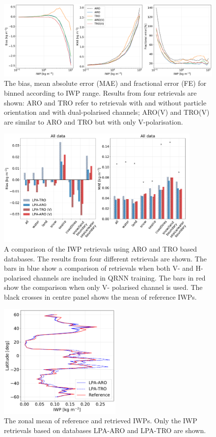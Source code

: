 \documentclass[amt, manuscript]{copernicus}
\begin{document}
\begin{figure}[t]
	\includegraphics[width=12cm]{Figures/IWP_statistics.pdf}
	\caption{The bias, mean absolute error (MAE) and fractional error (FE) for binned according to IWP range. Results from four retrievals are shown: ARO and TRO refer to retrievals with and without particle orientation and with dual-polarised channels; ARO(V) and TRO(V) are similar to ARO and TRO but with only V-polarisation. }
	\label{fig:IWP_stats}
\end{figure}



\begin{figure}[t]
	\includegraphics[width=10cm]{Figures/ARO_TRO_v_vh_all.pdf}
	\caption{A comparison of the IWP retrievals using ARO and TRO based databases. The results from four different retrievals are shown. The bars in blue show a comparison of retrievals when both V- and H- polarised channels are included in QRNN training. The bars in red show the comparison when only V- polarised channel is used. The black crosses in centre panel shows the mean of reference IWPs.  }
	\label{fig:bias_ARO_TRO}
\end{figure}

\begin{figure}[t]
	\includegraphics[width=6cm]{Figures/zonal_mean_all_jan_testdata.pdf}
	\caption{The zonal mean of reference and retrieved IWPs. Only the  IWP retrievals based on databases LPA-ARO and LPA-TRO are shown.}
	\label{fig:zonal_mean_test}
\end{figure}
\end{document}
